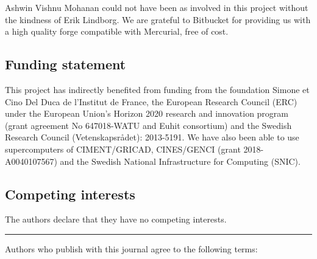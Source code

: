 Ashwin Vishnu Mohanan could not have been as involved in this project without the
kindness of Erik Lindborg.
%
We are grateful to Bitbucket for providing us with a high quality forge
compatible with Mercurial, free of cost.

\subsection*{Funding statement}


This project has indirectly benefited from funding from the foundation Simone et
Cino Del Duca de l'Institut de France, the European Research Council (ERC)
under the European Union's Horizon 2020 research and innovation program (grant
agreement No 647018-WATU and Euhit consortium) and the Swedish Research Council
(Vetenskapsr{\aa}det): 2013-5191.
%
We have also been able to use supercomputers of CIMENT/GRICAD, CINES/GENCI
(grant 2018-A0040107567) and the Swedish National Infrastructure for Computing
(SNIC).

\subsection*{Competing interests}

The authors declare that they have no competing interests.


%

\vspace{10pt}
\hrule
\vspace{10pt}


Authors who publish with this journal agree to the following terms: \\

